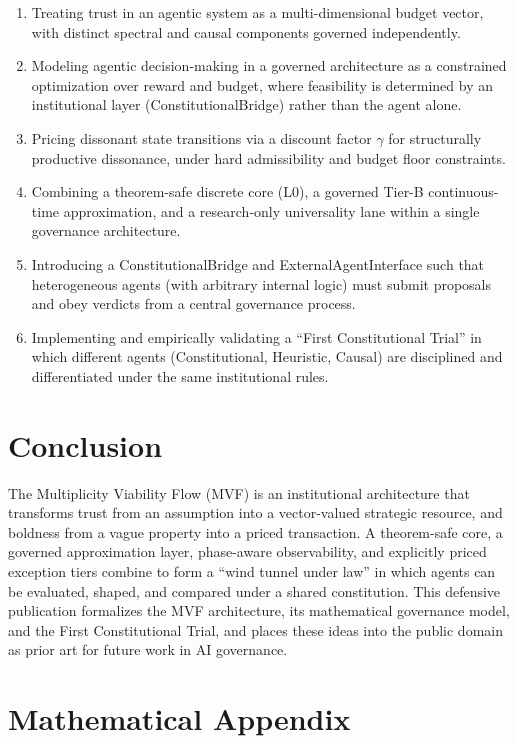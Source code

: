 \documentclass[11pt]{article}
\begin{document}
\begin{enumerate}[itemsep=2pt]
  \item Treating trust in an agentic system as a multi-dimensional budget vector, with distinct spectral and causal components governed independently.
  \item Modeling agentic decision-making in a governed architecture as a constrained optimization over reward and budget, where feasibility is determined by an institutional layer (ConstitutionalBridge) rather than the agent alone.
  \item Pricing dissonant state transitions via a discount factor \(\gamma\) for structurally productive dissonance, under hard admissibility and budget floor constraints.
  \item Combining a theorem-safe discrete core (L0), a governed Tier-B continuous-time approximation, and a research-only universality lane within a single governance architecture.
  \item Introducing a ConstitutionalBridge and ExternalAgentInterface such that heterogeneous agents (with arbitrary internal logic) must submit proposals and obey verdicts from a central governance process.
  \item Implementing and empirically validating a ``First Constitutional Trial'' in which different agents (Constitutional, Heuristic, Causal) are disciplined and differentiated under the same institutional rules.
\end{enumerate}

\section{Conclusion}

The Multiplicity Viability Flow (MVF) is an institutional architecture that transforms trust from an assumption into a vector-valued strategic resource, and boldness from a vague property into a priced transaction. A theorem-safe core, a governed approximation layer, phase-aware observability, and explicitly priced exception tiers combine to form a ``wind tunnel under law'' in which agents can be evaluated, shaped, and compared under a shared constitution. This defensive publication formalizes the MVF architecture, its mathematical governance model, and the First Constitutional Trial, and places these ideas into the public domain as prior art for future work in AI governance.

\appendix
\section*{Mathematical Appendix}
\setcounter{section}{0}
\end{document}
